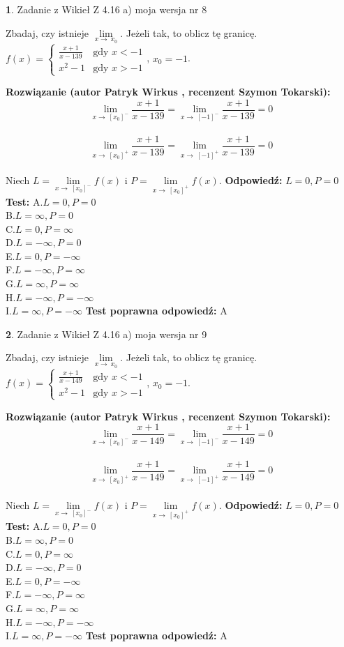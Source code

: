 \documentclass[12pt, a4paper]{article}
\theoremstyle{definition} %
\newtheorem{zad}{}
\newcommand{\zadStart}[1]{\begin{zad}#1\newline}
\newcommand{\zadStop}{\end{zad}}
\newcommand{\rozwStart}[2]{\noindent \textbf{Rozwiązanie (autor #1 , recenzent #2): }\newline}
\newcommand{\rozwStop}{\newline}
\newcommand{\odpStart}{\noindent \textbf{Odpowiedź:}\newline}
\newcommand{\odpStop}{\newline}
\newcommand{\testStart}{\noindent \textbf{Test:}\newline}
\newcommand{\testStop}{\newline}
\newcommand{\kluczStart}{\noindent \textbf{Test poprawna odpowiedź:}\newline}
\newcommand{\kluczStop}{\newline}
\begin{document}
\zadStart{Zadanie z Wikieł Z 4.16 a) moja wersja nr 8}

Zbadaj, czy istnieje $\lim\limits_{x\to\ x_{0}}$. Jeżeli tak, to oblicz tę granicę.\\   $f(x) = \left\{ \begin{array}{ll}
\frac{x+1}{x-139} & \textrm{gdy $x<-1$}\\
x^{2}-1 & \textrm{gdy $x>-1$}
\end{array} \right.$, $x_{0}=-1$.
\zadStop
\rozwStart{Patryk Wirkus}{Szymon Tokarski}
$$\lim\limits_{x\to\ [x_{0}]^{-}}\frac{x+1}{x-139} = \lim\limits_{x\to\ [-1]^{-}}\frac{x+1}{x-139} = 0$$
\\
$$\lim\limits_{x\to\ [x_{0}]^{+}}\frac{x+1}{x-139} = \lim\limits_{x\to\ [-1]^{+}}\frac{x+1}{x-139} = 0$$
\\
Niech $L=\lim\limits_{x\to\ [x_{0}]^{-}}f(x)$ i $P=\lim\limits_{x\to\ [x_{0}]^{+}}f(x)$.
\rozwStop
\odpStart
$L=0, P=0$
\odpStop
\testStart
A.$L=0, P=0$\\ B.$L=\infty, P=0$\\ C.$L=0, P=\infty$\\ D.$L=-\infty, P=0$\\ E.$L=0, P=-\infty$\\
F.$L=-\infty, P=\infty$\\ G.$L=\infty, P=\infty$\\
H.$L=-\infty, P=-\infty$\\
I.$L=\infty, P=-\infty$
\testStop
\kluczStart
A
\kluczStop



\zadStart{Zadanie z Wikieł Z 4.16 a) moja wersja nr 9}

Zbadaj, czy istnieje $\lim\limits_{x\to\ x_{0}}$. Jeżeli tak, to oblicz tę granicę.\\   $f(x) = \left\{ \begin{array}{ll}
\frac{x+1}{x-149} & \textrm{gdy $x<-1$}\\
x^{2}-1 & \textrm{gdy $x>-1$}
\end{array} \right.$, $x_{0}=-1$.
\zadStop
\rozwStart{Patryk Wirkus}{Szymon Tokarski}
$$\lim\limits_{x\to\ [x_{0}]^{-}}\frac{x+1}{x-149} = \lim\limits_{x\to\ [-1]^{-}}\frac{x+1}{x-149} = 0$$
\\
$$\lim\limits_{x\to\ [x_{0}]^{+}}\frac{x+1}{x-149} = \lim\limits_{x\to\ [-1]^{+}}\frac{x+1}{x-149} = 0$$
\\
Niech $L=\lim\limits_{x\to\ [x_{0}]^{-}}f(x)$ i $P=\lim\limits_{x\to\ [x_{0}]^{+}}f(x)$.
\rozwStop
\odpStart
$L=0, P=0$
\odpStop
\testStart
A.$L=0, P=0$\\ B.$L=\infty, P=0$\\ C.$L=0, P=\infty$\\ D.$L=-\infty, P=0$\\ E.$L=0, P=-\infty$\\
F.$L=-\infty, P=\infty$\\ G.$L=\infty, P=\infty$\\
H.$L=-\infty, P=-\infty$\\
I.$L=\infty, P=-\infty$
\testStop
\kluczStart
A
\kluczStop
\end{document}
